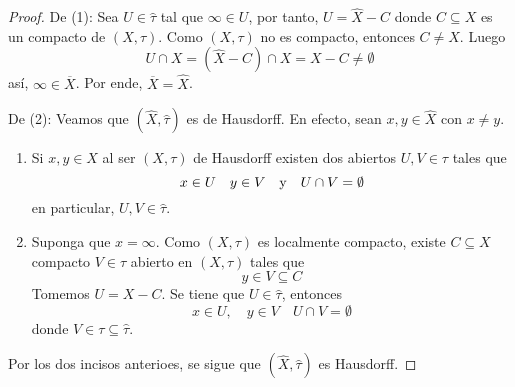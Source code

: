 \documentclass[12pt]{report}
\theoremstyle{largebreak}
\newcommand{\Cls}[1]{\ensuremath{\overline{#1}}}
\begin{document}
    \begin{proof}
        De (1): Sea $U\in\hat{\tau}$ tal que $\infty\in U$, por tanto, $U=\hat{X}-C$ donde $C\subseteq X$ es un compacto de $(X,\tau)$. Como $(X,\tau)$ no es compacto, entonces $C\neq X$. Luego
        \begin{equation*}
            U\cap X=(\hat{X}-C)\cap X=X-C\neq\emptyset
        \end{equation*}
        así, $\infty\in\Cls{X}$. Por ende, $\Cls{X}=\hat{X}$.

        De (2): Veamos que $(\hat{X},\hat{\tau})$ es de Hausdorff. En efecto, sean $x,y\in \hat{X}$ con $x\neq y$.
        \begin{enumerate}
            \item Si $x,y\in X$ al ser $(X,\tau)$ de Hausdorff existen dos abiertos $U,V\in\tau$ tales que
            \begin{equation*}
                x\in U\quad y\in V\quad\textup{y}\quad U\cap V=\emptyset
            \end{equation*}
            en particular, $U,V\in\hat{\tau}$.
            \item Suponga que $x=\infty$. Como $(X,\tau)$ es localmente compacto, existe $C\subseteq X$ compacto $V\in\tau$ abierto en $(X,\tau)$ tales que
            \begin{equation*}
                y\in V\subseteq C
            \end{equation*}
            Tomemos $U=X-C$. Se tiene que $U\in\hat{\tau}$, entonces
            \begin{equation*}
                x\in U,\quad y\in V\quad U\cap V=\emptyset
            \end{equation*}
            donde $V\in\tau\subseteq\hat{\tau}$.
        \end{enumerate}
        Por los dos incisos anterioes, se sigue que $(\hat{X},\hat{\tau})$ es Hausdorff.


\end{proof}
\end{document}
